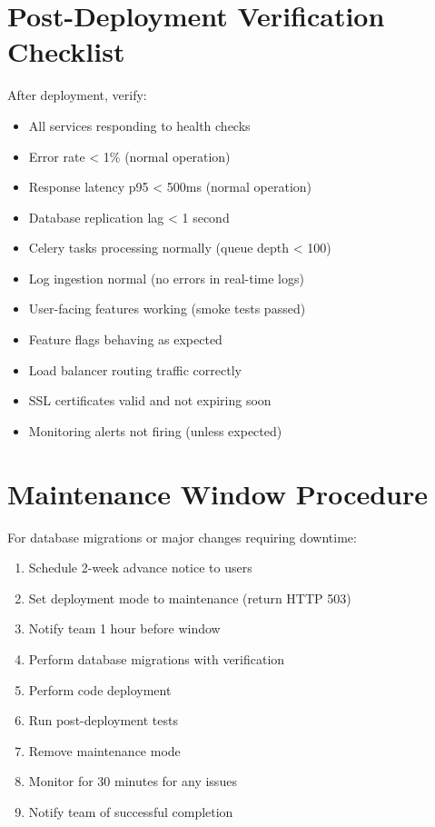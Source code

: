 \documentclass{report}
\begin{document}
\section{Post-Deployment Verification Checklist}

After deployment, verify:

\begin{itemize}
  \item All services responding to health checks
  \item Error rate < 1\% (normal operation)
  \item Response latency p95 < 500ms (normal operation)
  \item Database replication lag < 1 second
  \item Celery tasks processing normally (queue depth < 100)
  \item Log ingestion normal (no errors in real-time logs)
  \item User-facing features working (smoke tests passed)
  \item Feature flags behaving as expected
  \item Load balancer routing traffic correctly
  \item SSL certificates valid and not expiring soon
  \item Monitoring alerts not firing (unless expected)
\end{itemize}

\section{Maintenance Window Procedure}

For database migrations or major changes requiring downtime:

\begin{enumerate}
  \item Schedule 2-week advance notice to users
  \item Set deployment mode to maintenance (return HTTP 503)
  \item Notify team 1 hour before window
  \item Perform database migrations with verification
  \item Perform code deployment
  \item Run post-deployment tests
  \item Remove maintenance mode
  \item Monitor for 30 minutes for any issues
  \item Notify team of successful completion
\end{enumerate}
\end{document}
